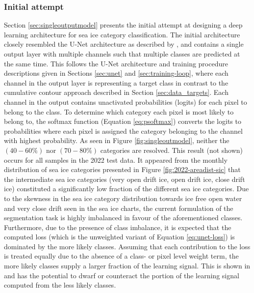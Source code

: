 \documentclass[../main/thesis]{subfiles}
\begin{document}
\subsubsection{Initial attempt}
\label{sec:multiclass-intitial}
Section \ref{sec:singleoutputmodel} presents the initial attempt at designing a deep learning architecture for sea ice category classification. The initial architecture closely resembled the U-Net architecture as described by \citet{Ronneberger2015}, and contains a single output layer with multiple channels such that multiple classes are predicted at the same time. This follows the U-Net architecture and training procedure descriptions given in Sections \ref{sec:unet} and \ref{sec:training-loop}, where each channel in the output layer is representing a target class in contrast to the cumulative contour approach described in Section \ref{sec:data_targets}. Each channel in the output contains unactivated probabilities (logits) for each pixel to belong to the class. To determine which category each pixel is most likely to belong to, the softmax function (Equation \ref{eq:psoftmax}) converts the logits to probabilities where each pixel is assigned the category belonging to the channel with highest probability. As seen in Figure \ref{fig:singleoutmodel}, neither the $(40 - 60\%)$ nor $(70 - 80\%)$ categories are resolved. This result (not shown) occurs for all samples in the 2022 test data. It appeared from the monthly distribution of sea ice categories presented in Figure \ref{fig:2022-areadist-sic} that the intermediate sea ice categories (very open drift ice, open drift ice, close drift ice) constituted a significantly low fraction of the different sea ice categories. Due to the skewness in the sea ice category distribution towards ice free open water and very close drift seen in the sea ice charts, the current formulation of the segmentation task is highly imbalanced in favour of the aforementioned classes. Furthermore, due to the presence of class imbalance, it is expected that the computed loss (which is the unweighted variant of Equation \ref{eq:unet-loss}) is dominated by the more likely classes. Assuming that each contribution to the loss is treated equally due to the absence of a class- or pixel level weight term, the more likely classes supply a larger fraction of the learning signal. This is shown in \citet{Lin2017} and has the potential to dwarf or counteract the portion of the learning signal computed from the less likely classes.
\end{document}
